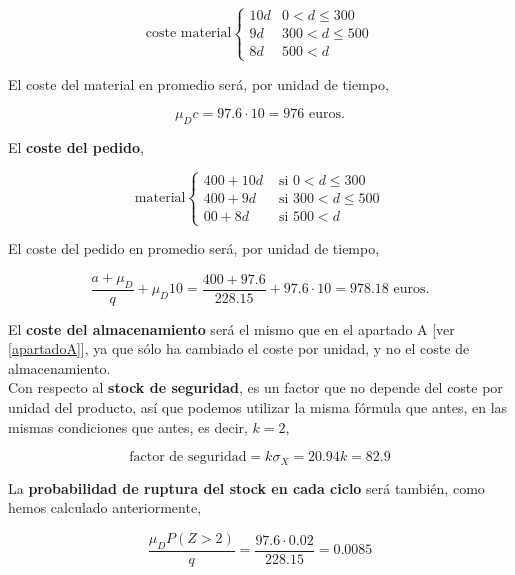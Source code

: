 \documentclass[a4paper,12pt]{article}
\begin{document}
\begin{equation*}
\text{coste material} \left\lbrace \begin{array}{ll}
	10d & 0 < d \leq 300\\
	9d  & 300 < d \leq 500 \\
	8d  & 500 < d
\end{array}
	\right.
\end{equation*}

El coste del material en promedio ser\'a, por unidad de tiempo, 

$$ \mu_D c = 97.6 \cdot 10 = 976\text{ euros.}$$ 

El \textbf{coste del pedido},

\begin{equation*}
\text{material} \left\lbrace \begin{array}{ll}
	400 + 10d & \text{ si } 0 < d \leq 300\\
	400 + 9d  & \text{ si } 300 < d \leq 500 \\
	00 + 8d   & \text{ si } 500 < d
\end{array}
	\right.
\end{equation*}

El coste del pedido en promedio ser\'a, por unidad de tiempo,

$$ \dfrac{a + \mu_D}{q} + \mu_D 10 = \dfrac{400 + 97.6}{228.15} + 97.6\cdot 10 = 978.18 \text{ euros.} $$

\smallskip

El \textbf{coste del almacenamiento} ser\'a el mismo que en el apartado A [ver \ref{apartadoA}], ya que s\'olo ha cambiado el coste por unidad, y no el coste de almacenamiento. \\

Con respecto al \textbf{stock de seguridad}, es un factor que no depende del coste por unidad del producto, as\'i que podemos utilizar la misma f\'ormula que antes, en las mismas condiciones que antes, es decir, $k=2$,

$$ \text{factor de seguridad} = k\sigma_X = 20.94k = 82.9$$

\smallskip

La \textbf{probabilidad de ruptura del stock en cada ciclo} ser\'a tambi\'en, como hemos calculado anteriormente,

$$\dfrac{\mu_D P(Z > 2)}{q} = \dfrac{97.6\cdot 0.02}{228.15} = 0.0085$$ 
	
\end{document}
